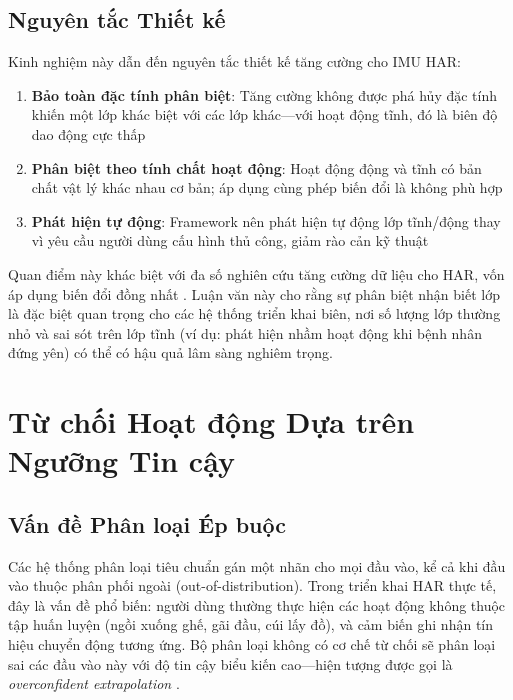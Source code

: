 \subsection{Nguyên tắc Thiết kế}
Kinh nghiệm này dẫn đến nguyên tắc thiết kế tăng cường cho IMU HAR:
\begin{enumerate}
    \item \textbf{Bảo toàn đặc tính phân biệt}: Tăng cường không được phá hủy đặc tính khiến một lớp khác biệt với các lớp khác---với hoạt động tĩnh, đó là biên độ dao động cực thấp
    \item \textbf{Phân biệt theo tính chất hoạt động}: Hoạt động động và tĩnh có bản chất vật lý khác nhau cơ bản; áp dụng cùng phép biến đổi là không phù hợp
    \item \textbf{Phát hiện tự động}: Framework nên phát hiện tự động lớp tĩnh/động thay vì yêu cầu người dùng cấu hình thủ công, giảm rào cản kỹ thuật
\end{enumerate}

Quan điểm này khác biệt với đa số nghiên cứu tăng cường dữ liệu cho HAR, vốn áp dụng biến đổi đồng nhất \cite{um2017data, le_guennec2016augmentation}. Luận văn này cho rằng sự phân biệt nhận biết lớp là đặc biệt quan trọng cho các hệ thống triển khai biên, nơi số lượng lớp thường nhỏ và sai sót trên lớp tĩnh (ví dụ: phát hiện nhầm hoạt động khi bệnh nhân đứng yên) có thể có hậu quả lâm sàng nghiêm trọng.

\section{Từ chối Hoạt động Dựa trên Ngưỡng Tin cậy}
\label{sec:confidence_discussion}

\subsection{Vấn đề Phân loại Ép buộc}
Các hệ thống phân loại tiêu chuẩn gán một nhãn cho mọi đầu vào, kể cả khi đầu vào thuộc phân phối ngoài (out-of-distribution). Trong triển khai HAR thực tế, đây là vấn đề phổ biến: người dùng thường thực hiện các hoạt động không thuộc tập huấn luyện (ngồi xuống ghế, gãi đầu, cúi lấy đồ), và cảm biến ghi nhận tín hiệu chuyển động tương ứng. Bộ phân loại không có cơ chế từ chối sẽ phân loại sai các đầu vào này với độ tin cậy biểu kiến cao---hiện tượng được gọi là \textit{overconfident extrapolation} \cite{hendrycks2017baseline}.


